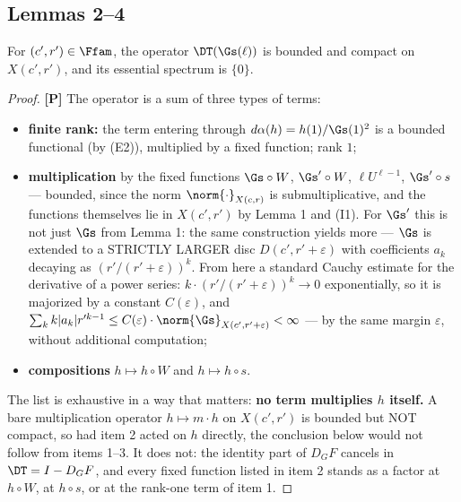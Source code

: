 \subsection{Lemmas 2--4}
\label{sec:10.4}

\begin{lemmatwo}
For $(c',r') \in \Ffam$, the operator
$\DT(\Gs(\ell))$ is bounded and compact on $X(c',r')$, and its essential spectrum
is $\{0\}$.
\end{lemmatwo}

\begin{proof}
\textbf{[P]} The operator is a sum of three types of terms:

\begin{itemize}
\item[1.] \textbf{finite rank:} the term entering through $d\alpha(h) = h(1)/\Gs(1)^2$ is a
   bounded functional (by (E2)), multiplied by a fixed function; rank $1$;
\item[2.] \textbf{multiplication} by the fixed functions $\Gs\circ W$, ${\Gs}'\circ W$, $\ell U^{\ell-1}$,
   ${\Gs}'\circ s$ --- bounded, since the norm $\norm{\cdot}_{X(c,r)}$ is submultiplicative, and
   the functions themselves lie in $X(c',r')$ by Lemma 1 and (I1). For ${\Gs}'$
   this is not just $\Gs$ from Lemma 1: the same construction yields more ---
   $\Gs$ is extended to a STRICTLY LARGER disc $D(c',r'+\varepsilon)$ with coefficients
   $a_k$ decaying as $(r'/(r'+\varepsilon))^k$. From here a standard Cauchy estimate for
   the derivative of a power series: $k\cdot(r'/(r'+\varepsilon))^k \to 0$ exponentially, so it
   is majorized by a constant $C(\varepsilon)$, and $\sum_k k|a_k| r'^{k-1} \le C(\varepsilon)\cdot \norm{\Gs}_{X(c',r'+\varepsilon)} < \infty$
   --- by the same margin $\varepsilon$, without additional computation;
\item[3.] \textbf{compositions} $h \mapsto h\circ W$ and $h \mapsto h\circ s$.
\end{itemize}

The list is exhaustive in a way that matters: \textbf{no term multiplies $h$ itself.} A bare multiplication operator $h\mapsto m\cdot h$ on $X(c',r')$ is bounded but NOT compact, so had item 2 acted on $h$ directly, the conclusion below would not follow from items 1--3. It does not: the identity part of $D_{G}F$ cancels in $\DT = I - D_{G}F$, and every fixed function listed in item 2 stands as a factor at $h\circ W$, at $h\circ s$, or at the rank-one term of item 1.



\end{proof}
